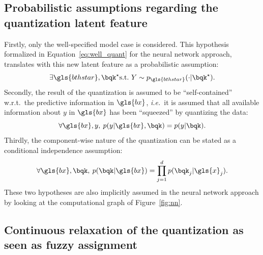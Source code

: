 \subsection{Probabilistic assumptions regarding the quantization latent feature}

Firstly, only the well-specified model case is considered. This hypothesis formalized in Equation~\ref{eq:well_quant} for the neural network approach, translates with this new latent feature as a probabilistic assumption:
\begin{equation} \label{hyp:true}
\exists \gls{bthstar}, \bqk^\star \text{s.t.\ } Y \sim p_{\gls{bthstar}}(\cdot | \bqk^\star).
\end{equation}
Secondly, the result of the quantization is assumed to be ``self-contained'' w.r.t.\ the predictive information in $\gls{bx}$, \textit{i.e.}\ it is assumed that all available information about $y$ in $\gls{bx}$ has been ``squeezed'' by quantizing the data:
\begin{equation} \label{hyp:squeeze}
\forall \gls{bx},y,\: p(y|\gls{bx},\bqk) = p(y|\bqk).
\end{equation}
Thirdly, the component-wise nature of the quantization can be stated as a conditional independence assumption:
\begin{equation} \label{hyp:component}
\forall \gls{bx},\bqk,\: p(\bqk|\gls{bx}) = \prod_{j=1}^d p(\bqk_j | \gls{x}_j).
\end{equation}
These two hypotheses are also implicitly assumed in the neural network approach by looking at the computational graph of Figure~\ref{fig:nn}.


\subsection{Continuous relaxation of the quantization as seen as fuzzy assignment} \label{subsec:fuzzy}

